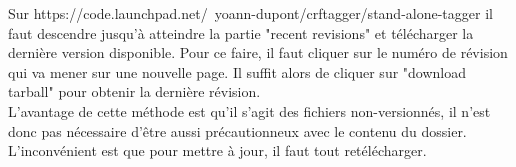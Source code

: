 \documentclass[manual-fr.tex]{subfiles}
\begin{document}
Sur https://code.launchpad.net/~yoann-dupont/crftagger/stand-alone-tagger
il faut descendre jusqu'à atteindre la partie "recent revisions" et
télécharger la dernière version disponible. Pour ce faire, il faut cliquer sur
le numéro de révision qui va mener sur une nouvelle page. Il suffit alors de
cliquer sur "download tarball" pour obtenir la dernière révision.\\

L'avantage de cette méthode est qu'il s'agit des fichiers non-versionnés, il
n'est donc pas nécessaire d'être aussi précautionneux avec le contenu du
dossier. L'inconvénient est que pour mettre à jour, il faut tout
retélécharger.
\end{document}
